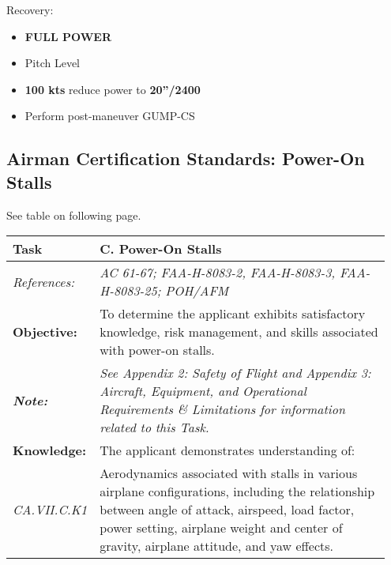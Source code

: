 Recovery:
\begin{itemize}[label={}]
\item \textbf{FULL POWER}
\item Pitch Level
\item \textbf{100 kts} reduce power to \textbf{20''/2400}
\item Perform post-maneuver GUMP-CS
\end{itemize}

\subsection{Airman Certification Standards: Power-On Stalls}

See table on following page.

\begin{table}[]
\begin{tabular}%
  {>{\raggedleft\arraybackslash}p{0.15\linewidth}%
   >{\raggedright\arraybackslash}p{0.8\linewidth}%
  }
\textbf{Task}           & \textbf{C. Power-On Stalls}                                                                                                                                                                                                                  \\ \hline
\textit{References:}    & \textit{AC 61-67; FAA-H-8083-2, FAA-H-8083-3, FAA-H-8083-25; POH/AFM}                                                                                                                                                                        \\
\textbf{Objective:}     & To determine the applicant exhibits satisfactory knowledge, risk management, and skills associated with power-on stalls.                                                                                                                     \\
\textit{\textbf{Note:}} & \textit{See Appendix 2: Safety of Flight and Appendix 3: Aircraft, Equipment, and Operational Requirements \& Limitations for information related to this Task.}                                                                             \\ \hline
\textbf{Knowledge:}     & The applicant demonstrates understanding of:                                                                                                                                                                                                 \\
\textit{CA.VII.C.K1}    & Aerodynamics associated with stalls in various airplane configurations, including the relationship between angle of attack, airspeed, load factor, power setting, airplane weight and center of gravity, airplane attitude, and yaw effects. \\

\end{tabular}
\end{table}

